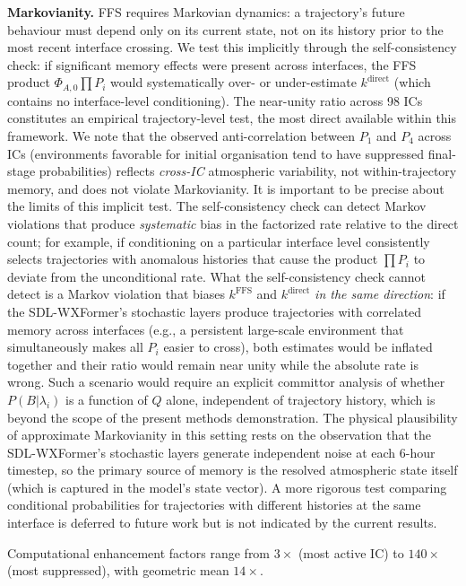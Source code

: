 \documentclass[11pt]{article}
\begin{document}
\textbf{Markovianity.}
FFS requires Markovian dynamics: a trajectory's future behaviour must depend only
on its current state, not on its history prior to the most recent interface crossing.
We test this implicitly through the self-consistency check: if significant
memory effects were present across interfaces, the FFS product $\Phi_{A,0}\prod P_i$
would systematically over- or under-estimate $k^{\text{direct}}$ (which contains no
interface-level conditioning). The near-unity ratio across 98 ICs constitutes an
empirical trajectory-level test, the most direct available within this framework.
We note that the observed anti-correlation between $P_1$ and $P_4$ across ICs
(environments favorable for initial organisation tend to have suppressed final-stage
probabilities) reflects \textit{cross-IC} atmospheric variability, not within-trajectory
memory, and does not violate Markovianity.
It is important to be precise about the limits of this implicit test.
The self-consistency check can detect Markov violations that produce
\emph{systematic} bias in the factorized rate relative to the direct count;
for example, if conditioning on a particular interface level consistently selects
trajectories with anomalous histories that cause the product $\prod P_i$ to deviate
from the unconditional rate.
What the self-consistency check cannot detect is a Markov violation that biases
$k^{\text{FFS}}$ and $k^{\text{direct}}$ \emph{in the same direction}: if the SDL-WXFormer's
stochastic layers produce trajectories with correlated memory across interfaces
(e.g., a persistent large-scale environment that simultaneously makes all $P_i$
easier to cross), both estimates would be inflated together and their ratio would
remain near unity while the absolute rate is wrong.
Such a scenario would require an explicit committor analysis of whether
$P(B|\lambda_i)$ is a function of $Q$ alone, independent of trajectory history,
which is beyond the scope of the present methods demonstration.
The physical plausibility of approximate Markovianity in this setting rests on the
observation that the SDL-WXFormer's stochastic layers generate independent noise
at each 6-hour timestep, so the primary source of memory is the resolved atmospheric
state itself (which is captured in the model's state vector).
A more rigorous test comparing conditional probabilities for trajectories with
different histories at the same interface is deferred to future work but is not
indicated by the current results.

Computational enhancement factors range from $3\times$ (most active IC) to $140\times$
(most suppressed), with geometric mean $14\times$.
\end{document}

